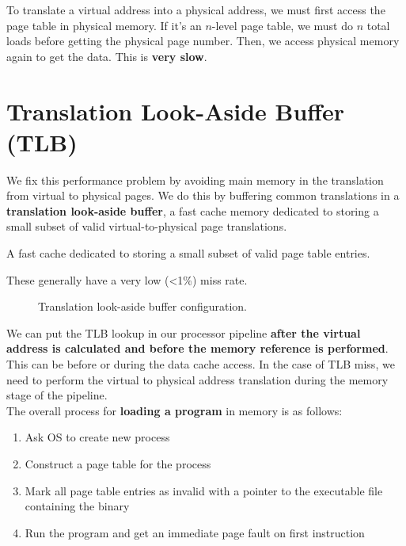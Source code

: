 \newpage
{}
To translate a virtual address into a physical address, we must first access the page table in physical memory. If it's an \(n\)-level page table, we must do \(n\) total loads before getting the physical page number. Then, we access physical memory again to get the data. This is \textbf{very slow}.

\section{Translation Look-Aside Buffer (TLB)}
We fix this performance problem by avoiding main memory in the translation from virtual to physical pages. We do this by buffering common translations in a \textbf{translation look-aside buffer}, a fast cache memory dedicated to storing a small subset of valid virtual-to-physical page translations.

\begin{definition}
  A fast cache dedicated to storing a small subset of valid page table entries.
  \begin{remark}
    These generally have a very low (<1\%) miss rate.
  \end{remark}
\end{definition}

\begin{figure}[H]
  \centering
  \caption{Translation look-aside buffer configuration.}
  \label{fig:tlb}
\end{figure}

We can put the TLB lookup in our processor pipeline \textbf{after the virtual address is calculated and before the memory reference is performed}. This can be before or during the data cache access. In the case of TLB miss, we need to perform the virtual to physical address translation during the memory stage of the pipeline.\\

The overall process for \textbf{loading a program} in memory is as follows:
\begin{enumerate}
  \item Ask OS to create new process
  \item Construct a page table for the process
  \item Mark all page table entries as invalid with a pointer to the executable file containing the binary
  \item Run the program and get an immediate page fault on first instruction
\end{enumerate}